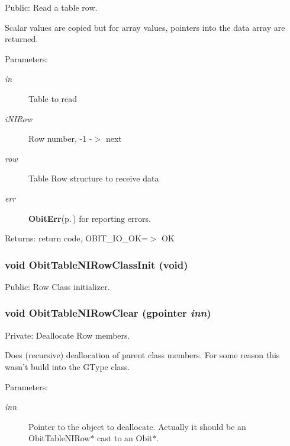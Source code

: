 Public: Read a table row. 

Scalar values are copied but for array values, pointers into the data array are returned. \begin{Desc}
\item[Parameters:]
\begin{description}
\item[{\em in}]Table to read \item[{\em i\-NIRow}]Row number, -1 -$>$ next \item[{\em row}]Table Row structure to receive data \item[{\em err}]{\bf Obit\-Err}{\rm (p.\,\pageref{structObitErr})} for reporting errors. \end{description}
\end{Desc}
\begin{Desc}
\item[Returns:]return code, OBIT\_\-IO\_\-OK=$>$ OK \end{Desc}
\subsubsection{\setlength{\rightskip}{0pt plus 5cm}void Obit\-Table\-NIRow\-Class\-Init (void)}\label{ObitTableNI_8c_a26}


Public: Row Class initializer. 

\subsubsection{\setlength{\rightskip}{0pt plus 5cm}void Obit\-Table\-NIRow\-Clear (gpointer {\em inn})}\label{ObitTableNI_8c_a7}


Private: Deallocate Row members. 

Does (recursive) deallocation of parent class members. For some reason this wasn't build into the GType class. \begin{Desc}
\item[Parameters:]
\begin{description}
\item[{\em inn}]Pointer to the object to deallocate. Actually it should be an Obit\-Table\-NIRow$\ast$ cast to an Obit$\ast$. \end{description}
\end{Desc}
